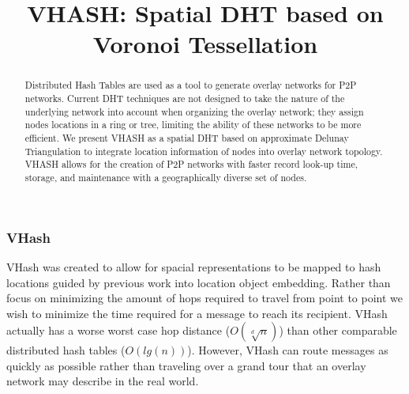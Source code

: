 \documentclass{article}
\title{VHASH: Spatial DHT based on Voronoi Tessellation}
\date{} %
\begin{document}



\maketitle
\vspace*{-0.55in}
\begin{abstract}
Distributed Hash Tables are used as a tool to generate overlay networks for P2P networks. Current DHT techniques are not designed to take the nature of the underlying network into account when organizing the overlay network; they assign nodes locations in a ring or tree, limiting the ability of these networks to be more efficient. We present VHASH as a spatial DHT based on approximate Delunay Triangulation to integrate location information of nodes into overlay network topology. VHASH allows for the creation of P2P networks with faster record look-up time, storage, and maintenance with a geographically diverse set of nodes.
\end{abstract}



\subsubsection*{VHash}
VHash was created to allow for spacial representations to be mapped to hash locations guided by previous work into location object embedding\citep{voronet}. Rather than focus on minimizing the amount of hops required to travel from point to point we wish to minimize the time required for a message to reach its recipient. VHash actually has a worse worst case hop distance ($O(\sqrt[d]{n})$) than other comparable distributed hash tables ($O(lg(n))$)\citep{chord}. However, VHash can route messages as quickly as possible rather than traveling over a grand tour that an overlay network may describe in the real world.

\end{document}
